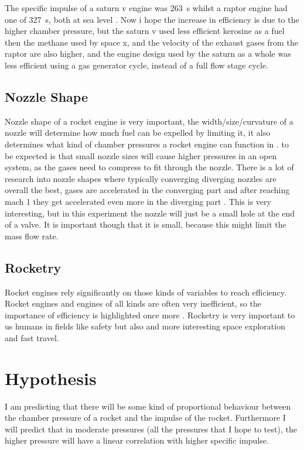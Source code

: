 \documentclass[12pt,a4paper]{article}
\begin{document}
The specific impulse of a saturn v engine was \SI{263}{\second} whilst a raptor engine had one of \SI{327}{\second}, both at sea level \cite{ref8}. Now i hope the increase in efficiency is due to the higher chamber pressure, but the saturn v used less efficient kerosine as a fuel then the methane used by space x, and the velocity of the exhaust gases from the raptor are also higher, and the engine design used by the saturn as a whole was less efficient using a gas generator cycle, instead of a full flow stage cycle.

\subsection{Nozzle Shape}

Nozzle shape of a rocket engine is very important, the width/size/curvature of a nozzle will determine how much fuel can be expelled by limiting it, it also determines what kind of chamber pressures a rocket engine can function in \cite{ref10}. to be expected is that small nozzle sizes will cause higher pressures in an open system, as the gases need to compress to fit through the nozzle. There is a lot of research into nozzle shapes where typically converging diverging nozzles are overall the best, gases are accelerated in the converging part and after reaching mach 1 they get accelerated even more in the diverging part \cite{ref11}. This is very interesting, but in this experiment the nozzle will just be a small hole at the end of a valve. It is important though that it is small, because this might limit the mass flow rate.

\subsection{Rocketry}

Rocket engines rely significantly on those kinds of variables to reach efficiency. Rocket engines and engines of all kinds are often very inefficient, so the importance of efficiency is highlighted once more \cite{ref12,ref13}. Rocketry is very important to us humans in fields like safety but also and more interesting space exploration and fast travel.

\section{Hypothesis}

I am predicting that there will be some kind of proportional behaviour between the chamber pressure of a rocket and the impulse of the rocket. Furthermore I will predict that in moderate pressures (all the pressures that I hope to test), the higher pressure will have a linear correlation with higher specific impulse.
\end{document}
